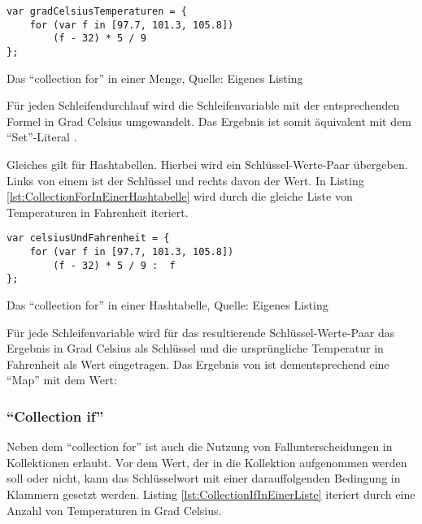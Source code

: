 \ifIncludeFigures
  \begin{listing}[ht]
    \begin{verbatim}
var gradCelsiusTemperaturen = {
    for (var f in [97.7, 101.3, 105.8])
        (f - 32) * 5 / 9
};
\end{verbatim}
    \caption[Das \enquote{collection for} in einer Menge]{Das \enquote{collection for} in einer Menge, Quelle: Eigenes Listing}
    \label{lst:CollectionForInEinerMenge}
  \end{listing}
\fi

Für jeden Schleifendurchlauf wird die Schleifenvariable  mit der entsprechenden Formel in Grad Celsius umgewandelt.
Das Ergebnis ist somit äquivalent mit dem \enquote{Set}-Literal .



Gleiches gilt für Hashtabellen.
Hierbei wird ein Schlüssel-Werte-Paar übergeben.
Links von einem \IC{:} ist der Schlüssel und rechts davon der Wert.
In Listing \ref{lst:CollectionForInEinerHashtabelle}
wird durch  die gleiche Liste von Temperaturen in Fahrenheit iteriert.


\ifIncludeFigures
  \begin{listing}[ht]
    \begin{verbatim}
var celsiusUndFahrenheit = {
    for (var f in [97.7, 101.3, 105.8])
        (f - 32) * 5 / 9 :  f
};
\end{verbatim}
    \caption[Das \enquote{collection for} in einer Hashtabelle]{Das \enquote{collection for} in einer Hashtabelle, Quelle: Eigenes Listing}
    \label{lst:CollectionForInEinerHashtabelle}
  \end{listing}
\fi

Für jede Schleifenvariable  wird für das resultierende Schlüssel-Werte-Paar das Ergebnis in Grad Celsius als Schlüssel und die ursprüngliche Temperatur in Fahrenheit als Wert eingetragen. 
Das Ergebnis von  ist dementsprechend eine \enquote{Map} mit dem Wert: 



\subsubsection{\enquote{Collection if}}

Neben dem \enquote{collection for} ist auch die Nutzung von Fallunterscheidungen in Kollektionen erlaubt.
Vor dem Wert, der in die Kollektion aufgenommen werden soll oder nicht,  kann  das Schlüsselwort  mit einer darauffolgenden Bedingung in Klammern gesetzt werden.
Listing \ref{lst:CollectionIfInEinerListe} iteriert durch eine Anzahl von Temperaturen in Grad Celsius.


